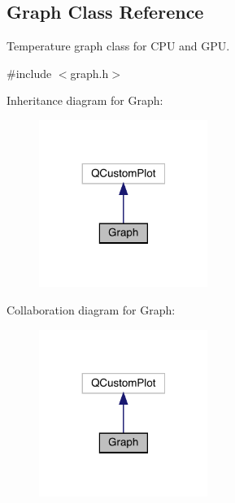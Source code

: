 \hypertarget{classGraph}{}\subsection{Graph Class Reference}
\label{classGraph}


Temperature graph class for C\+PU and G\+PU.  




{\ttfamily \#include $<$graph.\+h$>$}



Inheritance diagram for Graph\+:\nopagebreak
\begin{figure}[H]
\begin{center}
\leavevmode
\includegraphics[width=155pt]{classGraph__inherit__graph}
\end{center}
\end{figure}


Collaboration diagram for Graph\+:\nopagebreak
\begin{figure}[H]
\begin{center}
\leavevmode
\includegraphics[width=155pt]{classGraph__coll__graph}
\end{center}
\end{figure}
